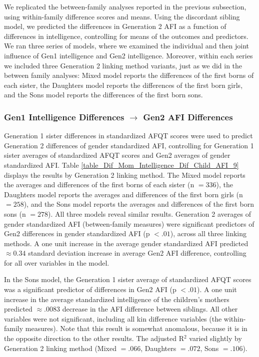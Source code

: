We replicated the between-family analyses reported in the previous subsection, using within-family difference scores and means. Using the discordant sibling model, we predicted the differences in Generation 2 AFI as a function of differences in intelligence, controlling for means of the outcomes and predictors. We ran three series of models, where we examined the individual and then joint influence of Gen1 intelligence and Gen2 intelligence. Moreover, within each series we included three Generation 2 linking method variants, just as we did in the between family analyses: Mixed model reports the differences of the first borns of each sister, the Daughters model reports the differences of the first born girls, and the Sons model reports the differences of the first born sons.

\subsubsection{Gen1 Intelligence Differences $\rightarrow$ Gen2 AFI Differences} 
Generation 1 sister differences in standardized AFQT scores were used to predict Generation 2 differences of gender standardized AFI, controlling for Generation 1 sister averages of standardized AFQT scores and Gen2 averages of gender standardized AFI. Table \ref{table_Dif_Mom_Intelligence_Dif_Child_AFI_9} displays the results by Generation 2 linking method. The Mixed model reports the averages and differences of the first borns of each sister (n $= 336$), the Daughters model reports the averages and differences of the first born girls (n $= 258$), and the Sons model reports the averages and differences of the first born sons (n $= 278$). All three models reveal similar results. Generation 2 averages of gender standardized AFI (between-family measures) were significant predictors of Gen2 differences in gender standardized AFI (p $< .01$), across all three linking methods. A one unit increase in the average gender standardized AFI predicted $\approx 0.34$ standard deviation increase in average Gen2 AFI difference, controlling for all over variables in the model. 

In the Sons model, the Generation 1 sister average of standardized AFQT scores was a significant predictor of differences in Gen2 AFI (p $< .01$). A one unit increase in the average standardized intelligence of the children's mothers predicted $\approx .0083$ decrease in the AFI difference between siblings. All other variables were not significant, including all kin difference variables (the within-family measures). Note that this result is somewhat anomalous, because it is in the opposite direction to the other results. The adjusted R$^{2}$ varied slightly by Generation 2 linking method (Mixed $= .066$, Daughters $= .072$, Sons $= .106$).

